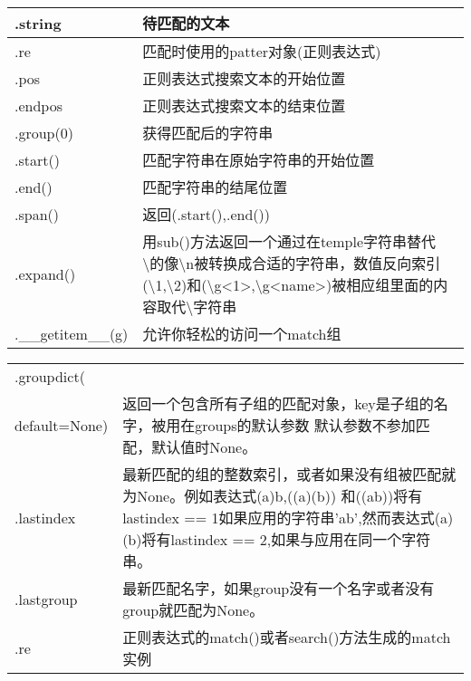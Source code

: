 \begin{center}
\begin{tabular}{|p{3cm}|p{8cm}|}
\hline
.string&待匹配的文本\\
\hline
.re&匹配时使用的patter对象(正则表达式)\\
\hline
.pos&正则表达式搜索文本的开始位置\\
\hline
.endpos&正则表达式搜索文本的结束位置\\
\hline
.group(0)&获得匹配后的字符串\\
\hline
.start()&匹配字符串在原始字符串的开始位置\\
\hline
.end()&匹配字符串的结尾位置\\
\hline
.span()&返回(.start(),.end())\\
\hline
.expand()&用sub()方法返回一个通过在temple字符串替代\textbackslash 的像\textbackslash n被转换成合适的字符串，数值反向索引(\textbackslash 1,\textbackslash 2)和(\textbackslash g<1>,\textbackslash g<name>)被相应组里面的内容取代\textbackslash 字符串\\
\hline
.\_\_getitem\_\_(g)&允许你轻松的访问一个match组\\
\hline
\end{tabular}
\end{center}

\begin{center}
\begin{tabular}{|p{2cm}|p{8cm}|}
\hline
.groupdict(\\default=None)&返回一个包含所有子组的匹配对象，key是子组的名字，被用在groups的默认参数
默认参数不参加匹配，默认值时None。\\
\hline
.lastindex&最新匹配的组的整数索引，或者如果没有组被匹配就为None。例如表达式(a)b,((a)(b))
和((ab))将有lastindex == 1如果应用的字符串'ab',然而表达式(a)(b)将有lastindex == 2,如果与应用在同一个字符串。\\
\hline
.lastgroup&最新匹配名字，如果group没有一个名字或者没有group就匹配为None。\\
\hline
.re&正则表达式的match()或者search()方法生成的match实例\\
\hline
\end{tabular}
\end{center}

